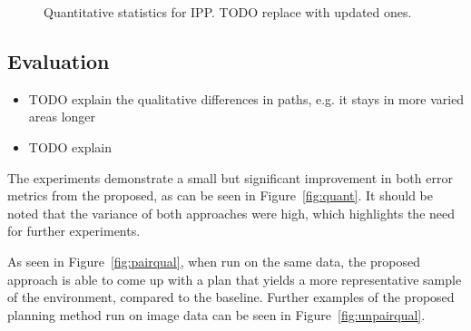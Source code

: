 \begin{figure}[h]
    \hfill
    \hfill
    \caption{Quantitative statistics for IPP. TODO replace with updated ones.}
    \label{fig:res_ipp_quant}
\end{figure}

\subsection{Evaluation}
\begin{itemize}
    \item TODO explain the qualitative differences in paths, e.g. it stays in more varied areas longer
    \item TODO explain
\end{itemize}

The experiments demonstrate a small but significant improvement in both error metrics from the proposed, as can be seen in Figure~\ref{fig:quant}. It should be noted that the variance of both approaches were high, which highlights the need for further experiments.

As seen in Figure~\ref{fig:pairqual}, when run on the same data, the proposed approach is able to come up with a plan that yields a more representative sample of the environment, compared to the baseline. Further examples of the proposed planning method run on image data can be seen in Figure~\ref{fig:unpairqual}. 

